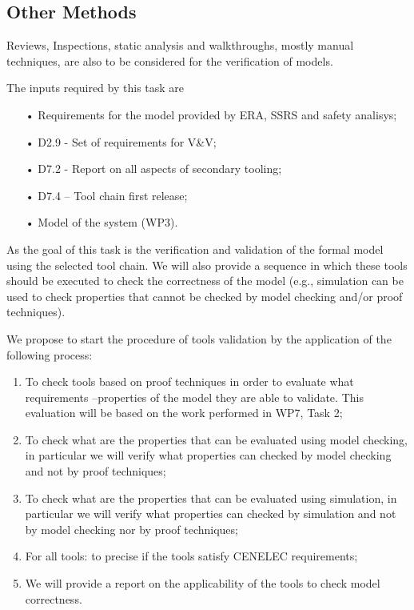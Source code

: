 \subsection{Other Methods}
Reviews, Inspections, static analysis and walkthroughs, mostly manual techniques, are also to be considered for the verification of models. 


The inputs required by this task are
\begin{itemize}
\item[•] Requirements for the model provided by ERA, SSRS and safety analisys;
\item[•] D2.9 - Set of requirements for V\&V;
\item[•] D7.2 - Report on all aspects of secondary tooling;
\item[•] D7.4 – Tool chain first release;
\item[•] Model of the system (WP3).
\end{itemize}	
		
As the goal of this task is the verification and validation of the formal model using the selected tool chain. We will also provide a sequence in which these tools should be executed to check the correctness of the model (e.g., simulation can be used to check properties that cannot be checked by model checking and/or proof techniques).

We propose to start the procedure of tools validation by the application of the following process:

\begin{enumerate}
\item To check tools based on proof techniques in order to evaluate what requirements –properties of the model they are able to validate. This evaluation will be based on the work performed in WP7, Task 2; 
\item To check what are the properties that can be evaluated using model checking, in particular we will verify what properties can checked by model checking and not by proof techniques;
\item To check what are the properties that can be evaluated using simulation, in particular we will verify what properties can checked by simulation and not by model checking nor by proof techniques;
\item For all tools:  to precise if the tools satisfy CENELEC requirements;
\item We will provide a report on the applicability of the tools to check model correctness.
\end{enumerate}

